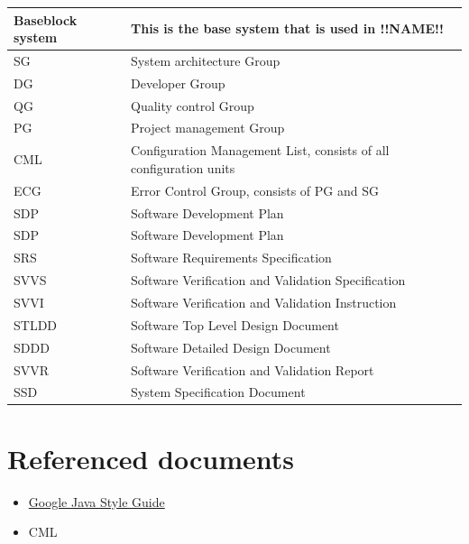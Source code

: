 \documentclass{article}
\begin{document}
    \begin{table}[h]
        \centering
        \begin{tabular}{| p{1.5cm} | p{9cm} |}
            \hline
                Baseblock system & This is the base system that is used in !!NAME!! \\
            \hline
                SG & System architecture Group \\
            \hline
                DG & Developer Group \\
            \hline
                QG & Quality control Group \\
            \hline
                PG & Project management Group \\
            \hline 
                CML & Configuration Management List, consists of all configuration units \\
            \hline            
                ECG & Error Control Group, consists of PG and SG \\
            \hline
                SDP & Software Development Plan \\
            \hline
                SDP & Software Development Plan \\
            \hline
                SRS & Software Requirements Specification \\
            \hline
                SVVS & Software Verification and Validation Specification \\
            \hline
                SVVI & Software Verification and Validation Instruction \\
            \hline
                STLDD & Software Top Level Design Document \\
            \hline
                SDDD & Software Detailed Design Document \\
            \hline
                SVVR & Software Verification and Validation Report \\
            \hline
                SSD & System Specification Document \\
            \hline
        \end{tabular}
    \end{table}

\section{Referenced documents}
    \begin{itemize}
        \item \href{https://google.github.io/styleguide/javaguide.html}{Google Java Style Guide}
        \item CML
    \end{itemize}
    
\end{document}
